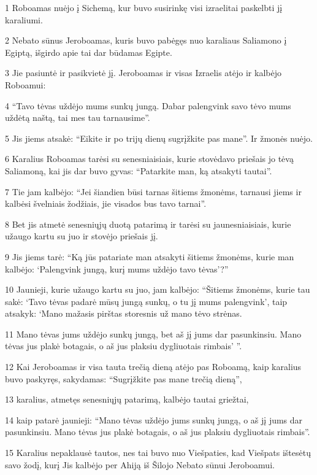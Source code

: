 \par 1 Roboamas nuėjo į Sichemą, kur buvo susirinkę visi izraelitai paskelbti jį karaliumi. 
\par 2 Nebato sūnus Jeroboamas, kuris buvo pabėgęs nuo karaliaus Saliamono į Egiptą, išgirdo apie tai dar būdamas Egipte. 
\par 3 Jie pasiuntė ir pasikvietė jį. Jeroboamas ir visas Izraelis atėjo ir kalbėjo Roboamui: 
\par 4 “Tavo tėvas uždėjo mums sunkų jungą. Dabar palengvink savo tėvo mums uždėtą naštą, tai mes tau tarnausime”. 
\par 5 Jis jiems atsakė: “Eikite ir po trijų dienų sugrįžkite pas mane”. Ir žmonės nuėjo. 
\par 6 Karalius Roboamas tarėsi su senesniaisiais, kurie stovėdavo priešais jo tėvą Saliamoną, kai jis dar buvo gyvas: “Patarkite man, ką atsakyti tautai”. 
\par 7 Tie jam kalbėjo: “Jei šiandien būsi tarnas šitiems žmonėms, tarnausi jiems ir kalbėsi švelniais žodžiais, jie visados bus tavo tarnai”. 
\par 8 Bet jis atmetė senesniųjų duotą patarimą ir tarėsi su jaunesniaisiais, kurie užaugo kartu su juo ir stovėjo priešais jį. 
\par 9 Jis jiems tarė: “Ką jūs patariate man atsakyti šitiems žmonėms, kurie man kalbėjo: ‘Palengvink jungą, kurį mums uždėjo tavo tėvas’?” 
\par 10 Jaunieji, kurie užaugo kartu su juo, jam kalbėjo: “Šitiems žmonėms, kurie tau sakė: ‘Tavo tėvas padarė mūsų jungą sunkų, o tu jį mums palengvink’, taip atsakyk: ‘Mano mažasis pirštas storesnis už mano tėvo strėnas. 
\par 11 Mano tėvas jums uždėjo sunkų jungą, bet aš jį jums dar pasunkinsiu. Mano tėvas jus plakė botagais, o aš jus plaksiu dygliuotais rimbais’ ”. 
\par 12 Kai Jeroboamas ir visa tauta trečią dieną atėjo pas Roboamą, kaip karalius buvo paskyręs, sakydamas: “Sugrįžkite pas mane trečią dieną”, 
\par 13 karalius, atmetęs senesniųjų patarimą, kalbėjo tautai griežtai, 
\par 14 kaip patarė jaunieji: “Mano tėvas uždėjo jums sunkų jungą, o aš jį jums dar pasunkinsiu. Mano tėvas jus plakė botagais, o aš jus plaksiu dygliuotais rimbais”. 
\par 15 Karalius nepaklausė tautos, nes tai buvo nuo Viešpaties, kad Viešpats ištesėtų savo žodį, kurį Jis kalbėjo per Ahiją iš Šilojo Nebato sūnui Jeroboamui. 
